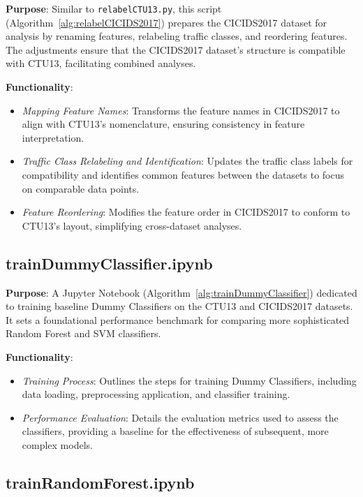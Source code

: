 \textbf{Purpose}: Similar to \texttt{relabelCTU13.py}, this script (Algorithm~\ref{alg:relabelCICIDS2017}) prepares the CICIDS2017 dataset for analysis by renaming features, relabeling traffic classes, and reordering features. The adjustments ensure that the CICIDS2017 dataset's structure is compatible with CTU13, facilitating combined analyses.

\textbf{Functionality}:

\begin{itemize}
    \item \textit{Mapping Feature Names}: Transforms the feature names in CICIDS2017 to align with CTU13's nomenclature, ensuring consistency in feature interpretation.
    \item \textit{Traffic Class Relabeling and Identification}: Updates the traffic class labels for compatibility and identifies common features between the datasets to focus on comparable data points.
    \item \textit{Feature Reordering}: Modifies the feature order in CICIDS2017 to conform to CTU13's layout, simplifying cross-dataset analyses.
\end{itemize}

\subsection{trainDummyClassifier.ipynb}

\textbf{Purpose}: A Jupyter Notebook (Algorithm~\ref{alg:trainDummyClassifier}) dedicated to training baseline Dummy Classifiers on the CTU13 and CICIDS2017 datasets. It sets a foundational performance benchmark for comparing more sophisticated Random Forest and SVM classifiers.

\textbf{Functionality}:

\begin{itemize}
    \item \textit{Training Process}: Outlines the steps for training Dummy Classifiers, including data loading, preprocessing application, and classifier training.
    \item \textit{Performance Evaluation}: Details the evaluation metrics used to assess the classifiers, providing a baseline for the effectiveness of subsequent, more complex models.
\end{itemize}

\subsection{trainRandomForest.ipynb}

